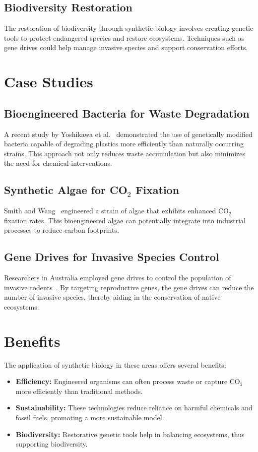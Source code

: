 \documentclass{article}
\begin{document}
\subsection{Biodiversity Restoration}
The restoration of biodiversity through synthetic biology involves creating genetic tools to protect endangered species and restore ecosystems. Techniques such as gene drives could help manage invasive species and support conservation efforts.

\section{Case Studies}

\subsection{Bioengineered Bacteria for Waste Degradation}
A recent study by Yoshikawa et al.~\cite{yoshikawa2020bioengineered} demonstrated the use of genetically modified bacteria capable of degrading plastics more efficiently than naturally occurring strains. This approach not only reduces waste accumulation but also minimizes the need for chemical interventions.

\subsection{Synthetic Algae for CO$_2$ Fixation}
Smith and Wang~\cite{smith2021syntheticalgae} engineered a strain of algae that exhibits enhanced CO$_2$ fixation rates. This bioengineered algae can potentially integrate into industrial processes to reduce carbon footprints.

\subsection{Gene Drives for Invasive Species Control}
Researchers in Australia employed gene drives to control the population of invasive rodents~\cite{australia2022genedrives}. By targeting reproductive genes, the gene drives can reduce the number of invasive species, thereby aiding in the conservation of native ecosystems.

\section{Benefits}
The application of synthetic biology in these areas offers several benefits:

\begin{itemize}
    \item \textbf{Efficiency:} Engineered organisms can often process waste or capture CO$_2$ more efficiently than traditional methods.
    \item \textbf{Sustainability:} These technologies reduce reliance on harmful chemicals and fossil fuels, promoting a more sustainable model.
    \item \textbf{Biodiversity:} Restorative genetic tools help in balancing ecosystems, thus supporting biodiversity.
\end{itemize}
\end{document}
